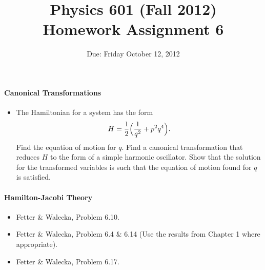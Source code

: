 \documentclass[letterpaper,11pt]{article}
\title{Physics 601 (Fall 2012) \\ Homework Assignment 6}
\date{Due: Friday October 12, 2012}
\begin{document}
\maketitle

\paragraph*{Canonical Transformations}
\begin{itemize}
 \item The Hamiltonian for a system has the form
 \begin{equation*}
  H = \frac{1}{2} \Bigl( \frac{1}{q^2} + p^2 q^4 \Bigr).
 \end{equation*}
 Find the equation of motion for $q$.  Find a canonical transformation that reduces $H$ to the form of a simple harmonic oscillator.  Show that the solution for the transformed variables is such that the equation of motion found for $q$ is satisfied.
\end{itemize}

\paragraph*{Hamilton-Jacobi Theory}
\begin{itemize}
 \item Fetter \& Walecka, Problem 6.10.
 \item Fetter \& Walecka, Problem 6.4 \& 6.14 (Use the results from Chapter 1 where appropriate).
 \item Fetter \& Walecka, Problem 6.17.
\end{itemize}
\end{document}
